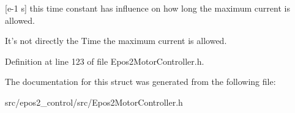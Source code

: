 \mbox{[}e-\/1 s\mbox{]} this time constant has influence on how long the maximum current is allowed. 

It's not directly the Time the maximum current is allowed. 

Definition at line 123 of file Epos2\-Motor\-Controller.\-h.



The documentation for this struct was generated from the following file\-:\begin{DoxyCompactItemize}
\item 
src/epos2\-\_\-control/src/Epos2\-Motor\-Controller.\-h\end{DoxyCompactItemize}

